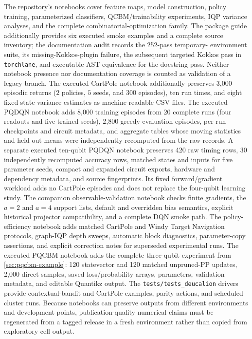 \documentclass[10pt]{article}
\newcommand{\code}[1]{\texttt{#1}}
\begin{document}
The repository's notebooks cover feature maps, model construction, policy
training, parameterized classifiers, QCBM/trainability experiments, IQP
variance analyses, and the complete combinatorial-optimization family.  The
package guide additionally provides six executed smoke examples and a complete
source inventory; the documentation audit records the 252-pass temporary-
environment suite, its missing-Kokkos-plugin failure, the subsequent targeted
Kokkos pass in \code{torchlane}, and executable-AST equivalence for the
docstring pass.  Neither notebook presence nor documentation coverage is
counted as validation of a legacy branch.
The
executed CartPole notebook additionally preserves 3,000 episodic returns
($2$ policies, $5$ seeds, and $300$ episodes), ten run times, and eight
fixed-state variance estimates as machine-readable CSV files.  The
executed PQDQN notebook adds 8,000 training episodes from 20 complete runs
(four readouts and five trained seeds), 2,800 greedy evaluation episodes,
per-run checkpoints and circuit metadata, and aggregate tables whose moving
statistics and held-out means were independently recomputed from the raw
records.  A separate executed ten-qubit PQDQN notebook preserves 420 raw timing
rows, 30 independently recomputed accuracy rows, matched states and inputs for
five parameter seeds, compact and expanded circuit exports, hardware and
dependency metadata, and source fingerprints.  Its fixed forward/gradient
workload adds no CartPole episodes and does not replace the four-qubit learning
study.  The companion observable-validation notebook checks finite gradients,
the $a=2$ and $a=4$ support lists, default and overridden bias semantics,
explicit historical projector compatibility, and a complete DQN smoke path.  The
policy-efficiency notebook adds matched CartPole and Windy Target Navigation
protocols, graph-IQP depth sweeps, automatic block diagnostics, parameter-copy
assertions, and explicit correction notes for superseded experimental runs.
The executed PQCBM notebook adds the complete three-qubit experiment from
\cref{sec:pqcbm-example}: 120 statevector and 120 matched unpruned-PP updates,
2,000 direct samples, saved loss/probability arrays, parameters, validation
metadata, and editable Quantikz output.
The \code{tests/tests\_deucalion} drivers provide contextual-bandit and CartPole
examples, parity actions, and scheduled cluster runs.  Because notebooks can
preserve outputs from different environments and development points,
publication-quality numerical claims must be regenerated from a tagged release
in a fresh environment rather than copied from exploratory cell output.
\end{document}
